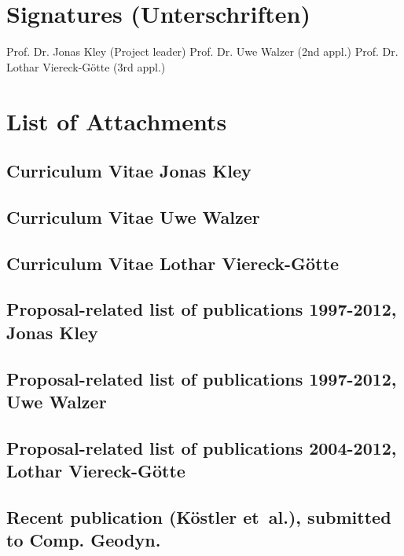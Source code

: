 \documentclass[twoside,10pt]{article}
\begin{document}
%
%

\section{Signatures (Unterschriften)}
{\small
\vspace{2.0cm}
Prof. Dr. Jonas Kley (Project leader) 
\hspace{0.3cm}
Prof. Dr. Uwe Walzer (2nd appl.)
\hspace{0.3cm}
Prof. Dr. Lothar Viereck-G\"otte (3rd appl.)
}
%
%

\section{List of Attachments}
\subsection{Curriculum Vitae Jonas Kley}
\subsection{Curriculum Vitae Uwe Walzer}
\subsection{Curriculum Vitae Lothar Viereck-G\"otte}
\subsection{Proposal-related list of publications 1997-2012, Jonas Kley}
\subsection{Proposal-related list of publications 1997-2012, Uwe Walzer}
\subsection{Proposal-related list of publications 2004-2012, Lothar Viereck-G\"otte}
\subsection{Recent publication (K\"ostler et~al.), submitted to Comp. Geodyn.}
\end{document}
